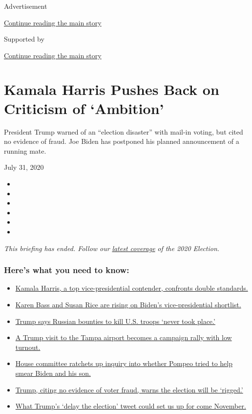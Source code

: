 Advertisement

\protect\hyperlink{after-top}{Continue reading the main story}

Supported by

\protect\hyperlink{after-sponsor}{Continue reading the main story}

\hypertarget{kamala-harris-pushes-back-on-criticism-of-ambition}{%
\section{Kamala Harris Pushes Back on Criticism of
`Ambition'}\label{kamala-harris-pushes-back-on-criticism-of-ambition}}

President Trump warned of an ``election disaster'' with mail-in voting,
but cited no evidence of fraud. Joe Biden has postponed his planned
announcement of a running mate.

July 31, 2020

\begin{itemize}
\item
\item
\item
\item
\item
\item
\end{itemize}

\emph{This briefing has ended. Follow our}
\href{https://www.nytimes.com/news-event/2020-election}{\emph{latest
coverage}} \emph{of the 2020 Election.}

\hypertarget{heres-what-you-need-to-know}{%
\subsubsection{Here's what you need to
know:}\label{heres-what-you-need-to-know}}

\begin{itemize}
\tightlist
\item
  \protect\hyperlink{link-29fdff45}{Kamala Harris, a top
  vice-presidential contender, confronts double standards.}
\item
  \protect\hyperlink{link-13ec3d9c}{Karen Bass and Susan Rice are rising
  on Biden's vice-presidential shortlist.}
\item
  \protect\hyperlink{link-49e9a016}{Trump says Russian bounties to kill
  U.S. troops `never took place.'}
\item
  \protect\hyperlink{link-48bfea37}{A Trump visit to the Tampa airport
  becomes a campaign rally with low turnout.}
\item
  \protect\hyperlink{link-2b118afb}{House committee ratchets up inquiry
  into whether Pompeo tried to help smear Biden and his son.}
\item
  \protect\hyperlink{link-47e04a0d}{Trump, citing no evidence of voter
  fraud, warns the election will be `rigged.'}
\item
  \protect\hyperlink{link-5c96ab71}{What Trump's `delay the election'
  tweet could set us up for come November.}
\end{itemize}

